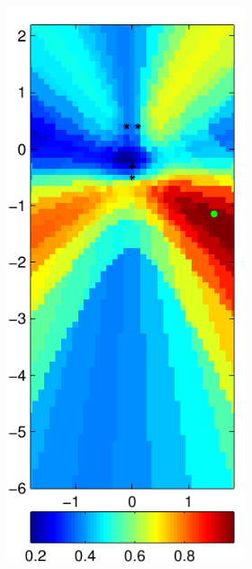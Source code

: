\documentclass[spanish,openright]{book}
\begin{document}
\begin{figure}
\begin{subfigure}[t]{0.47\textwidth}
\begin{minipage}[t]{\textwidth}
\begin{subfigure}[t]{0.3\textwidth}
\label{fig:SRP_Fo1500_pos01}
      \end{subfigure}
\begin{subfigure}[t]{0.3\textwidth}
        \includegraphics[width=\textwidth]{SRP_Fo1500_mean_pos01}

\end{subfigure}
\end{minipage}
\end{subfigure}
\end{figure}
\end{document}
